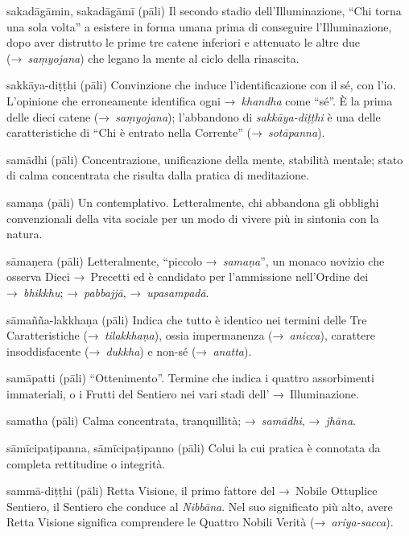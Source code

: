 \begin{glossarydescription}
\item[sakadāgāmin, sakadāgāmī] (pāli) Il secondo stadio dell'Illuminazione,
  ``Chi torna una sola volta'' a esistere in forma umana prima di conseguire
  l'Illuminazione, dopo aver distrutto le prime tre catene inferiori e attenuato
  le altre due (→~\emph{saṃyojana}) che legano la mente al ciclo della
  rinascita.

\item[sakkāya-diṭṭhi] (pāli) Convinzione che induce l'identificazione con il sé,
  con l'io. L'opinione che erroneamente identifica ogni →~\emph{khandha} come
  ``sé''. È la prima delle dieci catene (→~\emph{saṃyojana}); l'abbandono di
  \emph{sakkāya-diṭṭhi} è una delle caratteristiche di ``Chi è entrato nella
  Corrente'' (→~\emph{sotāpanna}).

\item[samādhi] (pāli) Concentrazione, unificazione della mente, stabilità
  mentale; stato di calma concentrata che risulta dalla pratica di meditazione.

\item[samaṇa] (pāli) Un contemplativo. Letteralmente, chi abbandona gli obblighi
  convenzionali della vita sociale per un modo di vivere più in sintonia con la
  natura.

\item[sāmaṇera] (pāli) Letteralmente, ``piccolo →~\emph{samaṇa}'', un monaco
  novizio che osserva Dieci →~Precetti ed è candidato per l'ammissione
  nell'Ordine dei →~\emph{bhikkhu}; →~\emph{pabbajjā}, →~\emph{upasampadā}.

\item[sāmañña-lakkhaṇa] (pāli) Indica che tutto è identico nei termini delle Tre
  Caratteristiche (→~\emph{tilakkhaṇa}), ossia impermanenza (→~\emph{anicca}),
  carattere insoddisfacente (→~\emph{dukkha}) e non-sé (→~\emph{anatta}).

\item[samāpatti] (pāli) ``Ottenimento''. Termine che indica i quattro
  assorbimenti immateriali, o i Frutti del Sentiero nei vari stadi dell'
  →~Illuminazione.

\item[samatha] (pāli) Calma concentrata, tranquillità; →~\emph{samādhi},
  →~\emph{jhāna}.

\item[sāmīcipaṭipanna, sāmīcipaṭipanno] (pāli) Colui la cui pratica è connotata
  da completa rettitudine o integrità.

\item[sammā-diṭṭhi] (pāli) Retta Visione, il primo fattore del →~Nobile
  Ottuplice Sentiero, il Sentiero che conduce al \emph{Nibbāna}. Nel suo
  significato più alto, avere Retta Visione significa comprendere le Quattro
  Nobili Verità (→~\emph{ariya-sacca}).


\end{glossarydescription}
